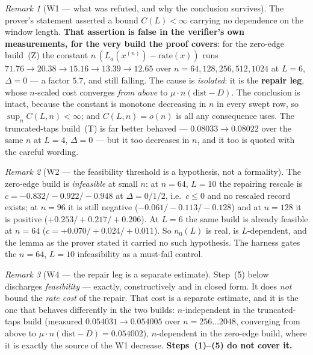 \documentclass[11pt]{article}
\theoremstyle{definition}
\theoremstyle{remark}
\newtheorem{remark}{Remark}
\begin{document}
\begin{remark}[W1 --- what was refuted, and why the conclusion survives]
\label{rem:W1}
The prover's statement asserted a bound $C(L)<\infty$ carrying no dependence
on the window length. \textbf{That assertion is false in the verifier's own
measurements, for the very build the proof covers}: for the zero-edge build~(Z) the constant
$n\,(L_a(x^{(n)})-\mathrm{rate}(x))$ runs
$71.76\to20.38\to15.16\to13.39\to12.65$ over $n=64,128,256,512,1024$ at
$L=6$, $\Delta=0$ --- a factor $5.7$, and still falling. The cause is
\emph{isolated}: it is the \textbf{repair leg}, whose $n$-scaled cost
converges \emph{from above} to $\mu\cdot n(\mathrm{dist}-D)$. The conclusion
is intact, because the constant is monotone decreasing in $n$ in every swept
row, so $\sup_nC(L,n)<\infty$; and $C(L,n)=o(n)$ is all any consequence
uses. The truncated-taps build~(T) is far better behaved --- $0.08033\to
0.08022$ over the same $n$ at $L=4$, $\Delta=0$ --- but it too decreases in
$n$, and it too is quoted with the careful wording.
\end{remark}

\begin{remark}[W2 --- the feasibility threshold is a hypothesis, not a
formality]
\label{rem:W2}
The zero-edge build is \emph{infeasible} at small $n$: at $n=64$, $L=10$ the
repairing rescale is $c=-0.832/-0.922/-0.948$ at $\Delta=0/1/2$, i.e.\ $c\le0$
and no rescaled record exists; at $n=96$ it is still negative
($-0.061/-0.113/-0.128$) and at $n=128$ it is positive
($+0.253/+0.217/+0.206$). At $L=6$ the same build is already feasible at
$n=64$ ($c=+0.070/+0.024/+0.011$). So $n_0(L)$ is real, is $L$-dependent, and
the lemma as the prover stated it carried no such hypothesis. The harness
gates the $n=64$, $L=10$ infeasibility as a must-fail control.
\end{remark}

\begin{remark}[W4 --- the repair leg is a separate estimate]
\label{rem:W4}
Step~(5) below discharges \emph{feasibility} --- exactly, constructively and
in closed form. It does \emph{not} bound the \emph{rate cost} of the repair.
That cost is a separate estimate, and it is the one that behaves differently
in the two builds: $n$-independent in the truncated-taps build (measured
$0.054031\to0.054005$ over $n=256\ldots2048$, converging from above to
$\mu\cdot n(\mathrm{dist}-D)=0.054002$), $n$-dependent in the zero-edge build,
where it is exactly the source of the W1 decrease. \textbf{Steps~(1)--(5) do
not cover it.}
\end{remark}
\end{document}
